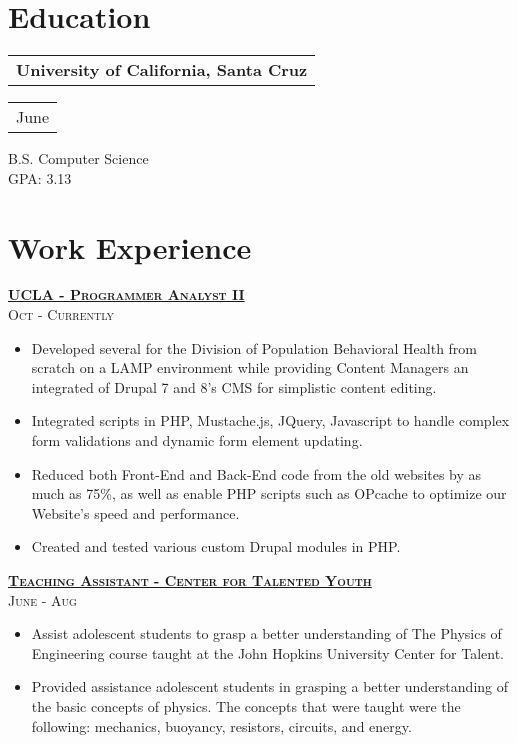 \documentclass{tccv}
\begin{document}
\begin{multicols}{2}

\section{Education}
\begin{tabular}[t]{@{}l} 
	{\textbf{University of California, Santa Cruz}}
\end{tabular}
\hfill%
\begin{tabular}[t]{l@{}}
 	{\footnotesize{June \textquotesingle16}}\medskip\\
\end{tabular}
B.S. Computer Science\\
GPA: 3.13

\section{Work Experience}

{\raggedleft\large\textsc\underline{\textbf{UCLA - Programmer Analyst II}}}\\
{\raggedleft\footnotesize\textsc{Oct  - Currently}}
\begin{itemize}[wide=0pt]
\item Developed several for the Division of Population Behavioral Health from scratch on a LAMP environment while providing Content Managers an integrated of Drupal 7 and 8's CMS for simplistic content editing. 
\item Integrated scripts in PHP, Mustache.js, JQuery, Javascript to handle complex form validations and dynamic form element updating. 
\item Reduced both Front-End and Back-End code from the old websites by as much as 75\%, as well as enable PHP scripts such as OPcache to optimize our Website's speed and performance.
\item Created and tested various custom Drupal modules in PHP.
\end{itemize}


\bigskip\medskip


{\raggedleft\large\textsc\underline{\textbf{Teaching Assistant - Center for Talented Youth}}}\\
{\raggedleft\footnotesize\textsc{June - Aug }}
\begin{itemize}[wide=0pt]
\item Assist adolescent students to grasp a better understanding of The Physics of Engineering course taught at the John Hopkins University Center for Talent.
\item Provided assistance adolescent students in grasping a better understanding of the basic concepts of physics. The concepts that were taught were the following: mechanics, buoyancy, resistors, circuits, and energy.
\end{itemize}


\end{multicols}
\end{document}
